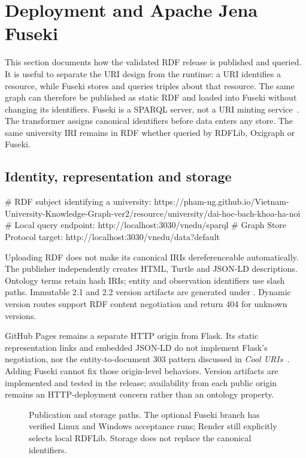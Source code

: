 \section{Deployment and Apache Jena Fuseki}
\label{sec:fuseki}
This section documents how the validated RDF release is published and queried. It is useful
to separate the URI design from the runtime: a URI identifies a resource, while Fuseki stores
and queries triples about that resource. The same graph can therefore be published as static
RDF and loaded into Fuseki without changing its identifiers.
Fuseki is a SPARQL server, not a URI minting service~\cite{fuseki}.
The transformer assigns canonical identifiers before data enters any store.
The same university IRI remains in RDF whether queried by RDFLib, Oxigraph or Fuseki.

\subsection{Identity, representation and storage}
\begin{code}
# RDF subject identifying a university:
https://pham-ng.github.io/Vietnam-University-Knowledge-Graph-ver2/resource/university/dai-hoc-bach-khoa-ha-noi
# Local query endpoint:
http://localhost:3030/vnedu/sparql
# Graph Store Protocol target:
http://localhost:3030/vnedu/data?default
\end{code}
Uploading RDF does not make its canonical IRIs dereferenceable automatically.
The publisher independently creates HTML, Turtle and JSON-LD descriptions. Ontology terms
retain hash IRIs; entity and observation identifiers use slash paths.
Immutable 2.1 and 2.2 version artifacts are generated under .
Dynamic version routes support RDF content negotiation and return 404 for unknown versions.

GitHub Pages remains a separate HTTP origin from Flask. Its static representation links
and embedded JSON-LD do not implement Flask's negotiation, nor the entity-to-document
303 pattern discussed in \emph{Cool URIs}~\cite{uris}. Adding Fuseki cannot fix those origin-level
behaviors. Version artifacts are implemented and tested in the release; availability from
each public origin remains an HTTP-deployment concern rather than an ontology property.

\begin{figure}[htbp]\centering
\resizebox{\textwidth}{!}{}
\caption[URI publication and optional Fuseki execution]{Publication and storage paths. The optional Fuseki
branch has verified Linux and Windows acceptance runs; Render still explicitly selects local RDFLib.
Storage does not replace the canonical identifiers.}\label{fig:deployment}
\end{figure}

